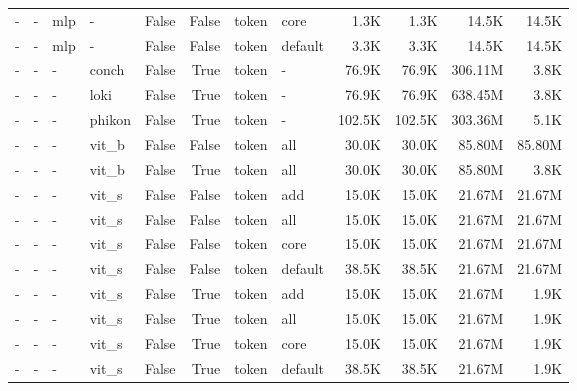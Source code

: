 \begin{table}
\begin{tabular}{llllrrllrrrr}
- & - & mlp & - & False & False & token & core & 1.3K & 1.3K & 14.5K & 14.5K \\
- & - & mlp & - & False & False & token & default & 3.3K & 3.3K & 14.5K & 14.5K \\
- & - & - & conch & False & True & token & - & 76.9K & 76.9K & 306.11M & 3.8K \\
- & - & - & loki & False & True & token & - & 76.9K & 76.9K & 638.45M & 3.8K \\
- & - & - & phikon & False & True & token & - & 102.5K & 102.5K & 303.36M & 5.1K \\
- & - & - & vit\_b & False & False & token & all & 30.0K & 30.0K & 85.80M & 85.80M \\
- & - & - & vit\_b & False & True & token & all & 30.0K & 30.0K & 85.80M & 3.8K \\
- & - & - & vit\_s & False & False & token & add & 15.0K & 15.0K & 21.67M & 21.67M \\
- & - & - & vit\_s & False & False & token & all & 15.0K & 15.0K & 21.67M & 21.67M \\
- & - & - & vit\_s & False & False & token & core & 15.0K & 15.0K & 21.67M & 21.67M \\
- & - & - & vit\_s & False & False & token & default & 38.5K & 38.5K & 21.67M & 21.67M \\
- & - & - & vit\_s & False & True & token & add & 15.0K & 15.0K & 21.67M & 1.9K \\
- & - & - & vit\_s & False & True & token & all & 15.0K & 15.0K & 21.67M & 1.9K \\
- & - & - & vit\_s & False & True & token & core & 15.0K & 15.0K & 21.67M & 1.9K \\
- & - & - & vit\_s & False & True & token & default & 38.5K & 38.5K & 21.67M & 1.9K \\
\bottomrule
\end{tabular}




\end{table}

